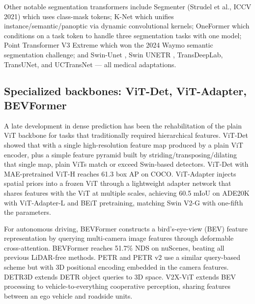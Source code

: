 \documentclass{article}
\begin{document}
Other notable segmentation transformers include Segmenter (Strudel et al., ICCV 2021) which uses class-mask tokens; K-Net which unifies instance/semantic/panoptic via dynamic convolutional kernels; OneFormer which conditions on a task token to handle three segmentation tasks with one model; Point Transformer V3 Extreme which won the 2024 Waymo semantic segmentation challenge; and Swin-Unet \citep{cao2023swinunetunetlikepu}, Swin UNETR \citep{hatamizadeh2022swinunetrswintrans}, TransDeepLab, TransUNet, and UCTransNet --- all medical adaptations.

\subsection{Specialized backbones: ViT-Det, ViT-Adapter, BEVFormer}\label{specialized-backbones-vit-det-vit-adapter-bevformer}

A late development in dense prediction has been the rehabilitation of the plain ViT backbone for tasks that traditionally required hierarchical features. ViT-Det \citep{li2023transformerbasedvi} showed that with a single high-resolution feature map produced by a plain ViT encoder, plus a simple feature pyramid built by striding/transposing/dilating that single map, plain ViTs match or exceed Swin-based detectors. ViT-Det with MAE-pretrained ViT-H reaches 61.3 box AP on COCO. ViT-Adapter \citep{chen2023palixonscalingupam} injects spatial priors into a frozen ViT through a lightweight adapter network that shares features with the ViT at multiple scales, achieving 60.5 mIoU on ADE20K with ViT-Adapter-L and BEiT pretraining, matching Swin V2-G with one-fifth the parameters.

For autonomous driving, BEVFormer \citep{li2023transformerbasedvi} constructs a bird's-eye-view (BEV) feature representation by querying multi-camera image features through deformable cross-attention. BEVFormer reaches 51.7\% NDS on nuScenes, beating all previous LiDAR-free methods. PETR \citep{liu2022aconvnetforthe2020} and PETR v2 use a similar query-based scheme but with 3D positional encoding embedded in the camera features. DETR3D extends DETR object queries to 3D space. V2X-ViT \citep{xu2022multiclasstokentra} extends BEV processing to vehicle-to-everything cooperative perception, sharing features between an ego vehicle and roadside units.
\end{document}
